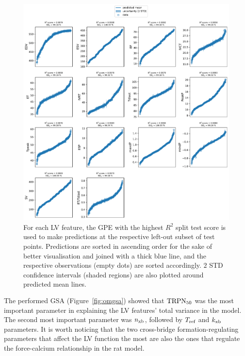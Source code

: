 \begin{figure}[ht!]
    \myfloatalign
    \includegraphics[width=\textwidth]{figures/chapter05/bgpes_vs_bsplit_om.pdf}
    \caption{For each LV feature, the GPE with the highest $R^2$ split test score is used to make predictions at the respective left-out subset of test points. Predictions are sorted in ascending order for the sake of better visualisation and joined with a thick blue line, and the respective observations (empty dots) are sorted accordingly. $2$ STD confidence intervals (shaded regions) are also plotted around predicted mean lines.}
    \label{fig:omgpes}
\end{figure}

\vspace{0.2cm}
The performed GSA (Figure~\ref{fig:omgsa}) showed that $\textrm{TRPN}_{50}$ was the most important parameter in explaining the LV features' total variance in the model. The second most important parameter was $n_{\textrm{xb}}$, followed by $T_{\textrm{ref}}$ and $k_{\textrm{xb}}$ parameters. It is worth noticing that the two cross-bridge formation-regulating parameters that affect the LV function the most are also the ones that regulate the force-calcium relationship in the rat model.

